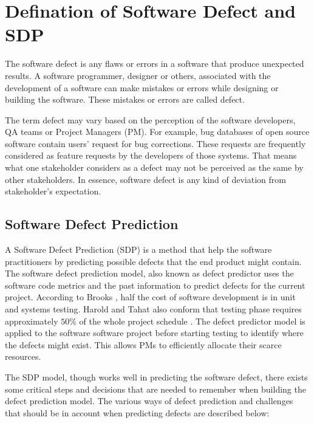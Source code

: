 \documentclass[12pt]{report}
\begin{document}
\section{Defination of Software Defect and SDP }
\label{defination_defect}
The software defect is any flaws or errors in a software that produce unexpected results. A software programmer, designer or others, associated with the development of a software can make mistakes or errors while designing or building the software. These mistakes or errors are called defect.

The term defect may vary based on the perception of the software developers, QA teams or Project Managers (PM). For example, bug databases of open source software contain users' request for bug corrections. These requests are frequently considered as feature requests by the developers of those systems. That means what one stakeholder considers as a defect may not be perceived as the same by other stakeholders. In essence, software defect is any kind of deviation from stakeholder's expectation.

\subsection{Software Defect Prediction}
\label{defination_defect_Predictors}
A Software Defect Prediction (SDP) is a method that help the software practitioners by predicting possible defects that the end product might contain. The software defect prediction model, also known as defect predictor uses the software code metrics and the past information to predict defects for the current project. According to Brooks \cite{brooks1995mythical}, half the cost of software development is in unit and systems testing. Harold and Tahat also conform that testing phase requires approximately $50\%$ of the whole project schedule \cite{harrold2000testing,tahat2001requirement}. The defect predictor model is applied to the software software project before starting testing to identify where the defects might exist. This allows PMs to efficiently allocate their scarce resources. 

The SDP model, though works well in predicting the software defect, there exists some critical steps and decisions that are needed to remember when building the defect prediction model. The various ways of defect prediction and challenges that should be in account when predicting defects are described below:
\end{document}
